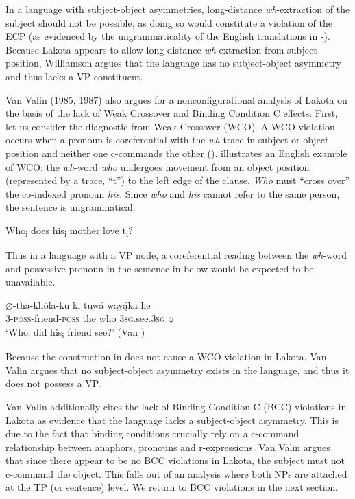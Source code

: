 \documentclass[output=paper]{LSP/langsci}
\begin{document}
In a language with subject-object asymmetries, long-distance \textit{wh}-extraction of the subject should not be possible, as doing so would constitute a violation of the ECP (as evidenced by the ungrammaticality of the English translations in -).  Because Lakota appears to allow long-distance \textit{wh}-extraction from subject position, Williamson argues that the language has no subject-object asymmetry and thus lacks a VP constituent.

Van Valin (1985, 1987) also argues for a nonconfigurational analysis of Lakota on the basis of the lack of Weak Crossover and Binding Condition C effects.  First, let us consider the diagnostic from Weak Crossover (WCO). A WCO violation occurs when a pronoun is coreferential with the \textit{wh}-trace in subject or object position and neither one c-commands the other (\citealt{Sportiche1985}).   illustrates an English example of WCO: the \textit{wh}-word \textit{who} undergoes movement from an object position (represented by a trace, ``t'') to the left edge of the clause. \textit{Who} must ``cross over'' the co-indexed pronoun \textit{his}. Since \textit{who} and \textit{his} cannot refer to the same person, the sentence is ungrammatical. 

\begin{exe}
\ex  *Who\textsubscript{i} does his\textsubscript{i} mother love t\textsubscript{i}?
\end{exe}

Thus in a language with a VP node, a coreferential reading between the \textit{wh}-word and possessive pronoun in the sentence in  below would be expected to be unavailable.

\begin{exe}
\ex \gll $\varnothing$-tha-kh\'ola-ku 	ki	tuw\'a	wąy\k{\'a}ka	he \\
3-\textsc{poss}-friend-\textsc{poss} the who		\textsc{3sg}.see.\textsc{3sg} 	\textsc{q} \\
\trans `Who\textsubscript{i} did his\textsubscript{i}  friend see?' (Van \citealt[379]{Valin1987})
\end{exe}

Because the construction in  does not cause a WCO violation in Lakota, Van Valin argues that no subject-object asymmetry exists in the language, and thus it does not possess a VP.
	
Van Valin additionally cites the lack of Binding Condition C (BCC) violations in Lakota as evidence that the language lacks a subject-object asymmetry.  This is due to the fact that binding conditions crucially rely on a c-command relationship between anaphors, pronouns and r-expressions.  Van Valin argues that since there appear to be no BCC violations in Lakota, the subject must not c-command the object. This falls out of an analysis where both NPs are attached at the TP (or sentence) level. We return to BCC violations in the next section.
\end{document}
